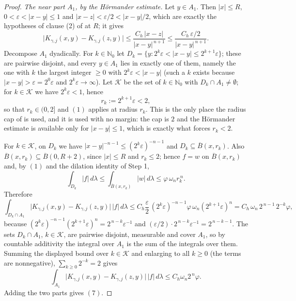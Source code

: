 \begin{proof}
\emph{The near part $A_1$, by the H\"ormander estimate.}  Let $y \in A_1$.
Then $|x| \leq R$, $0 < \varepsilon < |x-y| \leq 1$ and
$|x-z| < \varepsilon/2 < |x-y|/2$, which are exactly the hypotheses of clause
(2) of  at $R$; it gives
\[
  \bigl|K_{\gamma,j}(x,y)-K_{\gamma,j}(z,y)\bigr|
    \leq \frac{C_h\,|x-z|}{|x-y|^{\,n+1}}
    \leq \frac{C_h\,\varepsilon/2}{|x-y|^{\,n+1}} .
\]
Decompose $A_1$ dyadically.  For $k \in \mathbb{N}_0$ let
$D_k = \{y : 2^k\varepsilon < |x-y| \leq 2^{k+1}\varepsilon\}$; these are
pairwise disjoint, and every $y \in A_1$ lies in exactly one of them, namely
the one with $k$ the largest integer $\geq 0$ with $2^k\varepsilon < |x-y|$
(such a $k$ exists because $|x-y| > \varepsilon = 2^0\varepsilon$ and
$2^k\varepsilon \to \infty$).  Let $\mathcal{K}$ be the set of $k \in
\mathbb{N}_0$ with $D_k \cap A_1 \neq \emptyset$; for $k \in \mathcal{K}$ we
have $2^k\varepsilon < 1$, hence
\[
  r_k := 2^{k+1}\varepsilon < 2 ,
\]
so that $r_k \in (0,2]$ and $(1)$ applies at radius $r_k$.  This is the only
place the radius cap of  is used, and it is used
with no margin: the cap is $2$ and the H\"ormander estimate is available only
for $|x-y| \leq 1$, which is exactly what forces $r_k < 2$.

For $k \in \mathcal{K}$, on $D_k$ we have $|x-y|^{-n-1} \leq
(2^k\varepsilon)^{-n-1}$ and $D_k \subseteq \overline B(x,r_k)$.  Also
$\overline B(x,r_k) \subseteq \overline B(0,R+2)$, since $|x| \leq R$ and
$r_k \leq 2$; hence $f = w$ on $\overline B(x,r_k)$ and, by $(1)$ and the
dilation identity of Step 1,
\[
  \int_{D_k}|f|\,d\lambda \leq \int_{\overline B(x,r_k)}|w|\,d\lambda
    \leq \varphi\,\omega_n r_k^{\,n} .
\]
Therefore
\[
  \int_{D_k\cap A_1}\bigl|K_{\gamma,j}(x,y)-K_{\gamma,j}(z,y)\bigr|\,|f|\,d\lambda
    \leq C_h\frac{\varepsilon}{2}\,(2^k\varepsilon)^{-n-1}\varphi\,\omega_n
        (2^{k+1}\varepsilon)^n
    = C_h\,\omega_n\,2^{\,n-1}\,2^{-k}\varphi ,
\]
because
$(2^k\varepsilon)^{-n-1}(2^{k+1}\varepsilon)^n = 2^{\,n-k}\varepsilon^{-1}$ and
$(\varepsilon/2)\cdot2^{\,n-k}\varepsilon^{-1} = 2^{\,n-k-1}$.  The sets $D_k \cap A_1$, $k \in \mathcal{K}$, are pairwise disjoint,
measurable and cover $A_1$, so by countable additivity the integral over $A_1$
is the sum of the integrals over them.  Summing the displayed bound over
$k \in \mathcal{K}$ and enlarging to all $k \geq 0$ (the terms are
nonnegative), $\sum_{k\geq0}2^{-k} = 2$ gives
\[
  \int_{A_1}\bigl|K_{\gamma,j}(x,y)-K_{\gamma,j}(z,y)\bigr|\,|f|\,d\lambda
    \leq C_h\omega_n2^{\,n}\varphi .
\]
Adding the two parts gives $(7)$.


\end{proof}
